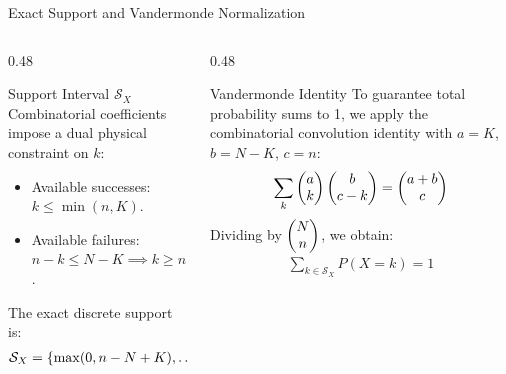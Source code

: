\documentclass[aspectratio=169,xcolor={dvipsnames,table}]{beamer}
\begin{document}
\begin{frame}{Exact Support and Vandermonde Normalization}
	\vspace{-0.15cm}
	\begin{columns}[T]
		\begin{column}{0.48\textwidth}
			\begin{block}{Support Interval $\mathcal{S}_X$}
				\scriptsize
				Combinatorial coefficients impose a dual physical constraint on $k$:
				\begin{itemize}
					\itemsep=0.04cm
					\item Available successes: $k \le \min(n, K)$.
					\item Available failures: $n-k \le N-K \implies k \ge n-(N-K)$.
				\end{itemize}
				The exact discrete support is:
				\begin{align*}
					\mathcal{S}_X = \left\{ \max(0, n-N+K), \dots, \min(n, K) \right\}
				\end{align*}
			\end{block}
		\end{column}
		\begin{column}{0.48\textwidth}
			\begin{exampleblock}{Vandermonde Identity}
				\scriptsize
				To guarantee total probability sums to 1, we apply the combinatorial convolution identity with $a=K$, $b=N-K$, $c=n$:
				\begin{align*}
					\sum_{k} \begin{pmatrix} a \\ k \end{pmatrix} \begin{pmatrix} b \\ c-k \end{pmatrix} = \begin{pmatrix} a+b \\ c \end{pmatrix}
				\end{align*}
				\vspace{-0.25cm}
				Dividing by $\begin{pmatrix} N \\ n \end{pmatrix}$, we obtain:
				\begin{align*}
					\sum_{k \in \mathcal{S}_X} P(X=k) = 1
				\end{align*}
			\end{exampleblock}
		\end{column}
	\end{columns}
\end{frame}
\end{document}
